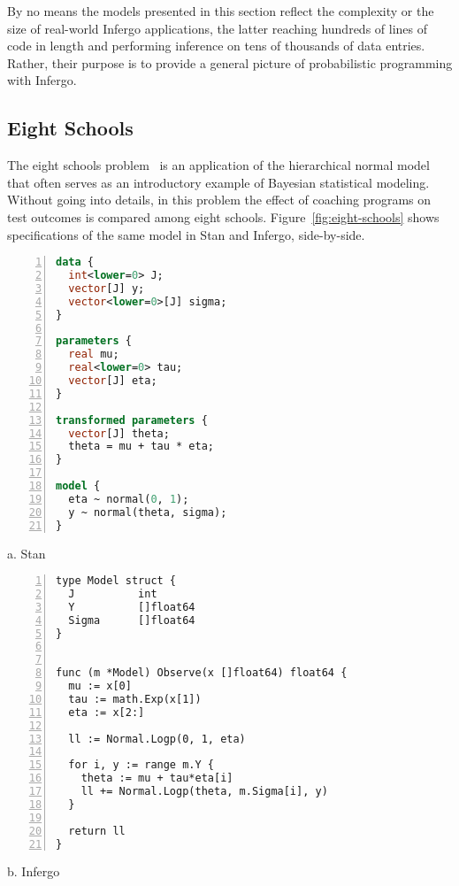 \documentclass[sigplan,review,10pt,anonymous]{acmart}
\begin{document}
\begin{sloppypar}
By no means the models presented in this section reflect the
complexity or the size of real-world Infergo applications, the
latter reaching hundreds of lines of code in length and
performing inference on tens of thousands of data entries.
Rather, their purpose is to provide a general picture of
probabilistic programming with Infergo.

\subsection{Eight Schools}
\label{sec:eight-schools}

The eight schools problem~\cite{GCS+03} is an application of
the hierarchical normal model that often serves as an introductory
example of Bayesian statistical modeling. Without going into
details, in this problem the effect of coaching programs on test
outcomes is compared among eight schools.
Figure~\ref{fig:eight-schools} shows specifications of the same
model in Stan and Infergo, side-by-side.
\begin{figure*}
  \begin{minipage}{0.45\textwidth}
  \begin{lstlisting}[language=Stan,framexleftmargin=10pt,numbers=left]
data {
  int<lower=0> J;
  vector[J] y;
  vector<lower=0>[J] sigma;
}

parameters {
  real mu;
  real<lower=0> tau;
  vector[J] eta;
}

transformed parameters {
  vector[J] theta;
  theta = mu + tau * eta;
}

model {
  eta ~ normal(0, 1);
  y ~ normal(theta, sigma);
}
\end{lstlisting}

\centering
a. Stan
  \end{minipage}
  \hfill
  \begin{minipage}{0.45\textwidth}
\begin{lstlisting}[framexleftmargin=10pt,numbers=left]
type Model struct {
  J          int
  Y          []float64
  Sigma      []float64
}


func (m *Model) Observe(x []float64) float64 {
  mu := x[0]
  tau := math.Exp(x[1])
  eta := x[2:]

  ll := Normal.Logp(0, 1, eta)

  for i, y := range m.Y {
    theta := mu + tau*eta[i]
    ll += Normal.Logp(theta, m.Sigma[i], y)
  }

  return ll
}
\end{lstlisting}
\centering
b. Infergo
  \end{minipage}
  \caption{Eight schools: Stan vs. Infergo. The Go implementation
  has a similar length and structure to the Stan model.}
  \label{fig:eight-schools}
\end{figure*}


\end{sloppypar}
\end{document}
